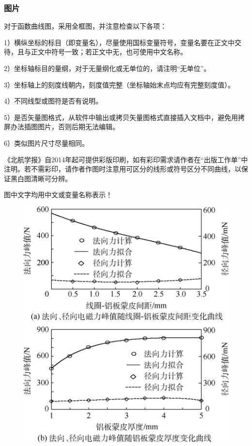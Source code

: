 \documentclass[10.5pt,twocolumn]{jbuaa}
\begin{document}
\subsubsection{图片}
对于函数曲线图，采用全框图，并注意检查以下各项：

1）横纵坐标的标目（即变量名），尽量使用国标变量符号，变量名要在正文中交待，且与正文中符号一致；若正文中无，也可使用中文名称。

2）坐标轴标目的量纲，对于无量纲化或无单位的，请注明``无单位”。

3）坐标轴上的刻度线朝内，刻度值完整（坐标轴始末点均应有完整刻度值）。

4）不同线型或图符是否有说明。

5）是否矢量图格式，从软件中输出或拷贝矢量图格式直接插入文档中，避免用拷屏办法插图图片，否则后期无法编辑。

6）类似图片尺寸尽量相同。

《北航学报》自2014年起可提供彩版印刷，如有彩印需求请作者在“出版工作单”中注明。若不需彩印，请作者作图时注意用可区分的线形或符号区分不同曲线，以保证黑白图清晰可分辨。 

图中文字均用中文或变量名称表示！
\begin{figure}[b!]
\centering
\includegraphics [scale=1,trim=0 0 0 0]{./image/tu1.png}
\end{figure}
\end{document}
